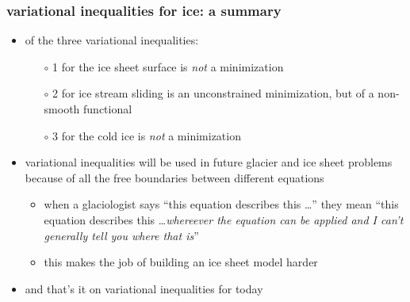 \documentclass{beamer}
\begin{document}
\begin{frame}
  \frametitle{variational inequalities for ice: a summary}

\begin{itemize}
\item of the three variational inequalities:
  \begin{itemize}
  \item[$\circ$] 1 for the ice sheet surface is \emph{not} a minimization
  \item[$\circ$] 2 for ice stream sliding is an unconstrained minimization, but of a non-smooth functional
  \item[$\circ$] 3 for the cold ice is \emph{not} a minimization
  \end{itemize}
\item<2-> variational inequalities will be used in future glacier and ice sheet problems because of all the free boundaries between different equations
  \begin{itemize}
  \item<2->[$\circ$] when a glaciologist says ``this equation describes this \dots'' they mean ``this equation describes this \dots \emph{whereever the equation can be applied and I can't generally tell you where that is}''
  \item<2->[$\circ$] this makes the job of building an ice sheet model harder
  \end{itemize}
\item<3-> \alert{and that's it on variational inequalities for today}
\end{itemize}
\end{frame}
\end{document}
